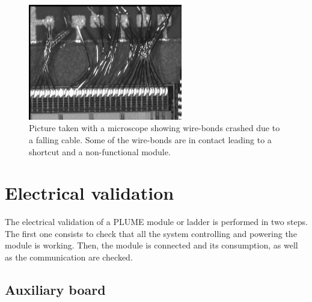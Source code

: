   \begin{figure}[!h]
    \centering
    \includegraphics[width=0.6\textwidth]{Pictures/labTests/crash_bonds.jpg}
    \caption{Picture taken with a microscope showing wire-bonds crashed due to a falling cable. Some of the wire-bonds are in contact leading to a shortcut and a non-functional module.}
    \label{fig:wireBondsCrashed}
  \end{figure}

\section{Electrical validation}

  The electrical validation of a \gls{PLUME} module or ladder is performed in two steps.
  The first one consists to check that all the system controlling and powering the module is working. 
  Then, the module is connected and its consumption, as well as the communication are checked.

  \subsection{Auxiliary board}

